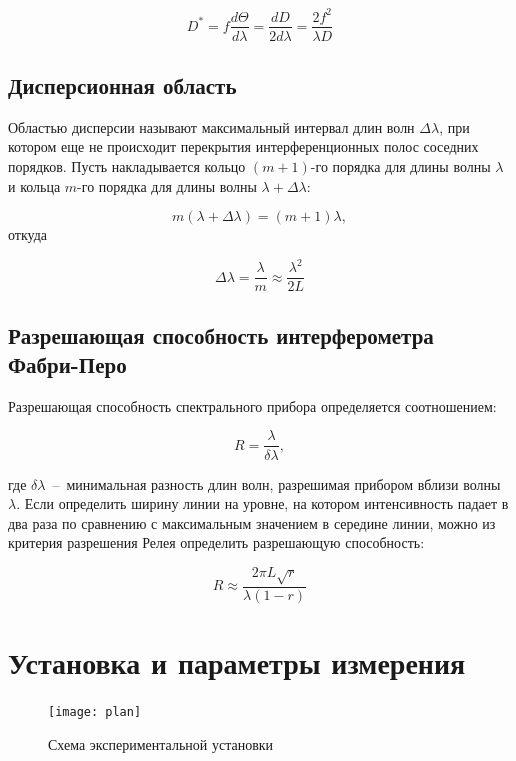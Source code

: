 \documentclass{letask}
\begin{document}
\[
D^* = f \dfrac{d \Theta}{d \lambda} = \dfrac{dD}{2 d \lambda} = \dfrac{2 f^2}{\lambda D}
\]

\subsection*{Дисперсионная область}

Областью дисперсии называют максимальный интервал длин волн $\Delta \lambda$, при котором еще не происходит перекрытия интерференционных полос соседних порядков. Пусть накладывается кольцо $(m+1)\text{-го порядка}$ для длины волны $\lambda$ и кольца $m\text{-го порядка}$ для длины волны $\lambda + \Delta \lambda$:

\begin{equation}
m(\lambda + \Delta \lambda) = (m+1)\lambda,
\end{equation}
откуда 

\begin{equation}
\Delta \lambda = \dfrac{\lambda}{m} \approx \dfrac{\lambda^2}{2L}
\end{equation}

\subsection*{Разрешающая способность интерферометра Фабри-Перо}

Разрешающая способность спектрального прибора определяется соотношением:

\begin{equation}
R = \dfrac{\lambda}{\delta \lambda},
\end{equation}

где $\delta \lambda$~--~минимальная разность длин волн, разрешимая прибором вблизи волны $\lambda$. Если определить ширину линии на уровне, на котором интенсивность падает в два раза по сравнению с максимальным значением в середине линии, можно из критерия разрешения Релея определить разрешающую способность:

\begin{equation}
R \approx \dfrac{2 \pi L \sqrt{r}}{\lambda (1-r)}
\end{equation}

\section{Установка и параметры измерения}

\begin{figure}
\texttt{[image: plan]}
\caption{Схема экспериментальной установки}
\end{figure}
\end{document}
